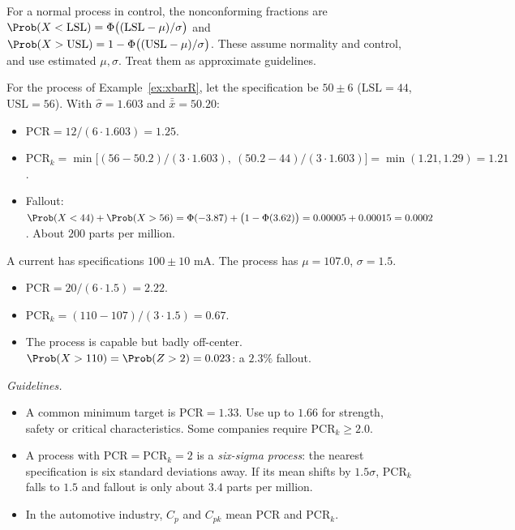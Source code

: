 For a normal process in control, the nonconforming fractions are $\Prob(X<\mathrm{LSL})=\Phi\big((\mathrm{LSL}-\mu)/\sigma\big)$ and $\Prob(X>\mathrm{USL})=1-\Phi\big((\mathrm{USL}-\mu)/\sigma\big)$. These assume normality and control, and use estimated $\mu,\sigma$. Treat them as approximate guidelines.

\begin{example}
For the process of Example~\ref{ex:xbarR}, let the specification be $50\pm6$ ($\mathrm{LSL}=44$, $\mathrm{USL}=56$). With $\hat\sigma=1.603$ and $\bar{\bar{x}}=50.20$:
\begin{itemize}
  \item $\mathrm{PCR}=12/(6\cdot1.603)=1.25$.
  \item $\mathrm{PCR}_k=\min\big[(56-50.2)/(3\cdot1.603),\ (50.2-44)/(3\cdot1.603)\big]=\min(1.21,1.29)=1.21$.
  \item Fallout: $\Prob(X<44)+\Prob(X>56)=\Phi(-3.87)+\big(1-\Phi(3.62)\big)=0.00005+0.00015=0.0002$. About $200$ parts per million.
\end{itemize}
\end{example}

\begin{example}
A current has specifications $100\pm10$ mA. The process has $\mu=107.0$, $\sigma=1.5$.
\begin{itemize}
  \item $\mathrm{PCR}=20/(6\cdot1.5)=2.22$.
  \item $\mathrm{PCR}_k=(110-107)/(3\cdot1.5)=0.67$.
  \item The process is capable but badly off-center. $\Prob(X>110)=\Prob(Z>2)=0.023$: a $2.3\%$ fallout.
\end{itemize}
\end{example}

\emph{Guidelines.}
\begin{itemize}
  \item A common minimum target is $\mathrm{PCR}=1.33$. Use up to $1.66$ for strength, safety or critical characteristics. Some companies require $\mathrm{PCR}_k\ge2.0$.
  \item A process with $\mathrm{PCR}=\mathrm{PCR}_k=2$ is a \emph{six-sigma process}: the nearest specification is six standard deviations away. If its mean shifts by $1.5\sigma$, $\mathrm{PCR}_k$ falls to $1.5$ and fallout is only about $3.4$ parts per million.
  \item In the automotive industry, $C_p$ and $C_{pk}$ mean PCR and PCR$_k$.
\end{itemize}

